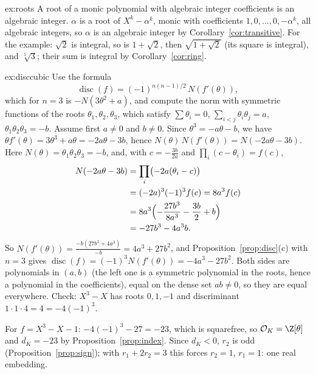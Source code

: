 \begin{solution}{ex:roots}
\idea A root of a monic polynomial with algebraic integer coefficients is an algebraic integer.
\writeup $\alpha$ is a root of $X^k-\alpha^k$, monic with coefficients $1,0,\dots,0,-\alpha^k$, all algebraic integers,
so $\alpha$ is an algebraic integer by Corollary~\ref{cor:transitive}. For the example: $\sqrt2$ is integral, so is
$1+\sqrt2$, then $\sqrt{1+\sqrt2}$ (its square is integral), and $\sqrt[5]3$; their sum is integral by
Corollary~\ref{cor:ring}.
\end{solution}

\begin{solution}{ex:disccubic}
\idea Use the formula
\[
\operatorname{disc}(f)=(-1)^{n(n-1)/2}\,N(f'(\theta)),
\]
which for $n=3$ is $-N(3\theta^2+a)$, and compute the
norm with symmetric functions of the roots $\theta_1,\theta_2,\theta_3$, which satisfy $\sum\theta_i=0$,
$\sum_{i<j}\theta_i\theta_j=a$, $\theta_1\theta_2\theta_3=-b$.
\writeup Assume first $a\ne0$ and $b\ne0$. Since $\theta^3=-a\theta-b$, we have $\theta f'(\theta)=3\theta^3+a\theta=
-2a\theta-3b$, hence $N(\theta)\,N(f'(\theta))=N(-2a\theta-3b)$. Here $N(\theta)=\theta_1\theta_2\theta_3=-b$, and, with
$c=-\frac{3b}{2a}$ and $\prod_i(c-\theta_i)=f(c)$,
\begin{align*}
N(-2a\theta-3b)&=\prod_i\bigl(-2a(\theta_i-c)\bigr)\\&=(-2a)^3(-1)^3f(c)=8a^3f(c)\\
&=8a^3\Bigl(-\frac{27b^3}{8a^3}-\frac{3b}2+b\Bigr)\\&=-27b^3-4a^3b.
\end{align*}
So $N(f'(\theta))=\frac{-b(27b^2+4a^3)}{-b}=4a^3+27b^2$, and Proposition~\ref{prop:disc}(c) with $n=3$ gives
$\operatorname{disc}(f)=(-1)^3N(f'(\theta))=-4a^3-27b^2$. Both sides are polynomials in $(a,b)$ (the left one is a
symmetric polynomial in the roots, hence a polynomial in the coefficients), equal on the dense set $ab\ne0$, so they are
equal everywhere. Check: $X^3-X$ has roots $0,1,-1$ and discriminant $1\cdot1\cdot4=4=-4(-1)^3$.

For $f=X^3-X-1$: $-4(-1)^3-27=-23$, which is squarefree, so $\mathcal O_K=\Z[\theta]$ and $d_K=-23$ by
Proposition~\ref{prop:index}. Since $d_K<0$, $r_2$ is odd (Proposition~\ref{prop:sign}); with $r_1+2r_2=3$ this
forces $r_2=1$, $r_1=1$: one real embedding.
\end{solution}

